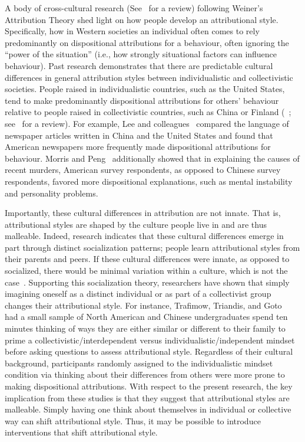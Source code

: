 \documentclass{sfuthesis}
\begin{document}
A body of cross-cultural research (See~\cite{smith93} for a review) following Weiner’s~\cite{weiner85} Attribution Theory shed light on how people develop an attributional style.  Specifically, how in Western societies an individual often comes to rely predominantly on dispositional attributions for a behaviour, often ignoring the “power of the situation” (i.e., how strongly situational factors can influence behaviour). Past research demonstrates that there are predictable cultural differences in general attribution styles between individualistic and collectivistic societies. People raised in individualistic countries, such as the United States, tend to make predominantly dispositional attributions for others’ behaviour relative to people raised in collectivistic countries, such as China or Finland (~\cite{lee96, miller84,morris94}; see~\cite{smith93} for a review). For example, Lee and colleagues~\cite{lee96} compared the language of newspaper articles written in China and the United States and found that American newspapers more frequently made dispositional attributions for behaviour. Morris and Peng~\cite{morris94} additionally showed that in explaining the causes of recent murders, American survey respondents, as opposed to Chinese survey respondents, favored more dispositional explanations, such as mental instability and personality problems.

Importantly, these cultural differences in attribution are not innate. That is, attributional styles are shaped by the culture people live in and are thus malleable. Indeed, research indicates that these cultural differences emerge in part through distinct socialization patterns; people learn attributional styles from their parents and peers. If these cultural differences were innate, as opposed to socialized, there would be minimal variation within a culture, which is not the case~\cite{smith93}. Supporting this socialization theory, researchers have shown that simply imagining oneself as a distinct individual or as part of a collectivist group changes their attributional style. For instance, Trafimow, Triandis, and Goto~\cite{trafimow91} had a small sample of North American and Chinese undergraduates spend ten minutes thinking of ways they are either similar or different to their family to prime a collectivistic/interdependent versus individualistic/independent mindset before asking questions to assess attributional style. Regardless of their cultural background, participants randomly assigned to the individualistic mindset condition via thinking about their differences from others were more prone to making dispositional attributions. With respect to the present research, the key implication from these studies is that they suggest that attributional styles are malleable. Simply having one think about themselves in individual or collective way can shift attributional style. Thus, it may be possible to introduce interventions that shift attributional style.
\end{document}
